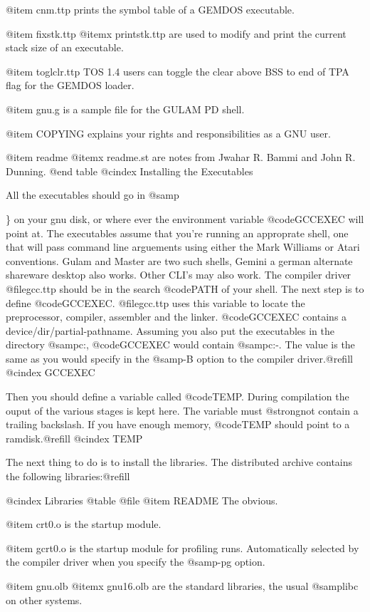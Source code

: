 @item cnm.ttp
prints the symbol table of a GEMDOS executable.

@item fixstk.ttp
@itemx printstk.ttp
are used to modify and print the current stack size of an
executable.

@item toglclr.ttp
TOS 1.4 users can toggle the clear above BSS to end of TPA flag
for the GEMDOS loader.

@item gnu.g
is a sample file for the GULAM PD shell.

@item COPYING
explains your rights and responsibilities as a GNU user.

@item readme
@itemx readme.st
are notes from Jwahar R. Bammi and John R. Dunning.
@end table
@cindex Installing the Executables

All the executables should go in @samp{\gnu\bin\} on your gnu disk, or where
ever the environment variable @code{GCCEXEC} will point at. The executables
assume that you're running an approprate shell, one that will pass
command line arguements using either the Mark Williams or Atari conventions.
Gulam and Master are two such shells, Gemini a
german alternate shareware desktop also works. Other CLI's may also
work. The compiler driver @file{gcc.ttp} should be in the search @code{PATH} of
your shell. The next step is to define @code{GCCEXEC}.
@file{gcc.ttp} uses this variable to locate the preprocessor, compiler,
assembler and the linker. @code{GCCEXEC} contains a
device/dir/partial-pathname. Assuming you also put the executables in
the directory @samp{c:\gnu\bin}, @code{GCCEXEC} would contain
@samp{c:\gnu\bin\gcc-}. The value is the same as you would specify in the
@samp{-B} option to the compiler driver.@refill
@cindex GCCEXEC

Then you should define a variable called @code{TEMP}. During compilation
the ouput of the various stages is kept here. The variable must
@strong{not} contain a trailing backslash. If you have enough memory,
@code{TEMP} should point to a ramdisk.@refill
@cindex TEMP

The next thing to do is to install the libraries. The distributed
archive contains the following libraries:@refill

@cindex Libraries
@table @file
@item README
The obvious.

@item crt0.o
is the startup module.

@item gcrt0.o
is the startup module for profiling runs. Automatically selected by the
compiler driver when you specify the @samp{-pg} option.

@item gnu.olb
@itemx gnu16.olb
are the standard libraries, the usual @samp{libc} on other systems.

}
